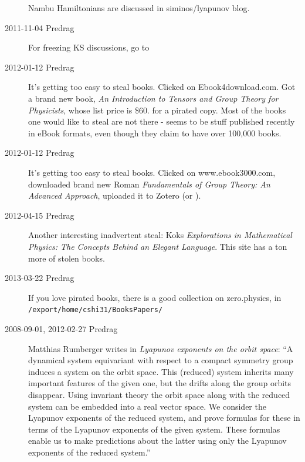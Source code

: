 \begin{description}
Nambu Hamiltonians are discussed in siminos/lyapunov blog.

\item[2011-11-04 Predrag] For freezing KS discussions, go to

\item[2012-01-12 Predrag] It's getting too easy to steal books. Clicked on
{Ebook4download.com}. Got a brand new book, {\em An
Introduction to Tensors and Group Theory for Physicists}, whose list
price is \$60. 
for a pirated copy. Most of the books one would like to steal are not
there - seems to be stuff published recently in eBook formats, even though
they claim to have over 100,000 books.

\item[2012-01-12 Predrag] It's getting too easy to steal books. Clicked
on
{www.ebook3000.com}, downloaded brand new Roman {\em
Fundamentals of Group Theory: An Advanced Approach}, uploaded it to
Zotero (or ).

\item[2012-04-15 Predrag]
Another interesting inadvertent steal: Koks {\em
Explorations in Mathematical Physics: The Concepts Behind an Elegant
Language}.
{This site} has a ton more of stolen books.

\item[2013-03-22 Predrag]
If you love pirated books, there is a good collection on zero.physics, in
\texttt{/export/home/cshi31/BooksPapers/}

\item[2008-09-01, 2012-02-27 Predrag]
{Matthias Rumberger} writes in
{\emph{Lyapunov exponents on the orbit space}}:
``A dynamical system equivariant with respect to a compact symmetry
group induces a system on the orbit space. This (reduced) system
inherits many important features of the given one, but the drifts along the
group orbits disappear. Using invariant theory the orbit space along with the
reduced system can be embedded into a real vector space. We consider the
Lyapunov exponents of the reduced system, and prove formulas for these in
terms of the Lyapunov exponents of the given system. These formulas enable
us to make predictions about the latter using only the Lyapunov exponents of
the reduced system.''


\end{description}
